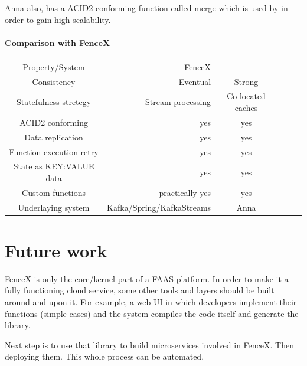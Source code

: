 \documentclass[a4]{report}
\begin{document}
        Anna also, has a ACID2 conforming function called merge which is used by \cite{Functions-as-a-Service-2020} in
        order to gain high scalability.

        \paragraph{Comparison with FenceX}
        \begin{center}
            \begin{tabular}{ cr cr cr }
                Property/System  & FenceX  &    \cite{Functions-as-a-Service-2020} \\
                Consistency  & Eventual  &  Strong  \\
                Statefulness stretegy  & Stream processing  &  Co-located caches  \\
                ACID2 conforming  & yes  &  yes  \\
                Data replication  & yes  &  yes  \\
                Function execution retry  & yes  &  yes  \\
                State as KEY:VALUE data  & yes  &  yes  \\
                Custom functions  & practically yes  &  yes  \\
                Underlaying system  & Kafka/Spring/KafkaStreams  &  Anna  \\
            \end{tabular}
        \end{center}

        \section{Future work}
        FenceX is only the core/kernel part of a FAAS platform.
        In order to make it a fully functioning cloud service, some other tools and layers should be built around and
        upon it.
        For example, a web UI in which developers implement their functions (simple cases) and the system compiles
        the code itself and generate the library.

        Next step is to use that library to build microservices involved in FenceX.
        Then deploying them.
        This whole process can be automated.

        \nocite{*}
        
        
    
\end{document}
